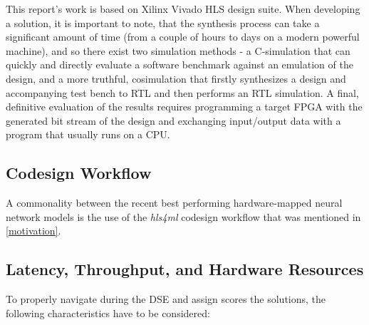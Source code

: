 This report's work is based on Xilinx Vivado HLS design suite. When developing a solution, it is important to note, that the synthesis process can take a significant amount of time (from a couple of hours to days on a modern powerful machine), and so there exist two simulation methods - a C-simulation that can quickly and directly evaluate a software benchmark against an emulation of the design, and a more truthful, cosimulation that firstly synthesizes a design and accompanying test bench to RTL and then performs an RTL simulation. A final, definitive evaluation of the results requires programming a target FPGA with the generated bit stream of the design and exchanging input/output data with a program that usually runs on a CPU.

\todofig{|}
\todofig{|}
\todofig{|}


\subsection{\hlsml Codesign Workflow}
A commonality between the recent best performing hardware-mapped neural network models is the use of the \textit{hls4ml} codesign workflow that was mentioned in \cref{motivation}.
\indo{|}
\indo{|}
\indo{|}
\indo{|}


\subsection{Latency, Throughput, and Hardware Resources}\label{latency-throughput-resources}
To properly navigate during the DSE and assign scores the solutions, the following characteristics have to be considered:


